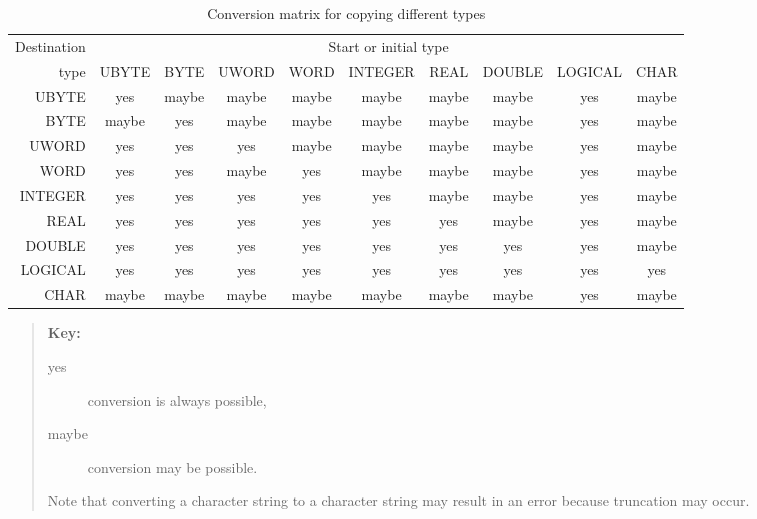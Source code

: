 \begin{table}[htbp]

\begin{center}
{\footnotesize
\begin{tabular}{r|ccccccccc}
Destination &\multicolumn{9}{c}{Start or initial type} \\
type    & UBYTE & BYTE  & UWORD & WORD  & INTEGER & REAL  & DOUBLE & LOGICAL & CHAR   \\ \hline
UBYTE   &  yes  & maybe & maybe & maybe & maybe   & maybe & maybe  &   yes   & maybe  \\
BYTE    & maybe &  yes  & maybe & maybe & maybe   & maybe & maybe  &   yes   & maybe  \\
UWORD   &  yes  &  yes  &  yes  & maybe & maybe   & maybe & maybe  &   yes   & maybe  \\
WORD    &  yes  &  yes  & maybe &  yes  & maybe   & maybe & maybe  &   yes   & maybe  \\
INTEGER &  yes  &  yes  &  yes  &  yes  &  yes    & maybe & maybe  &   yes   & maybe  \\
REAL    &  yes  &  yes  &  yes  &  yes  &  yes    &  yes  & maybe  &   yes   & maybe  \\
DOUBLE  &  yes  &  yes  &  yes  &  yes  &  yes    &  yes  &  yes   &   yes   & maybe  \\
LOGICAL &  yes  &  yes  &  yes  &  yes  &  yes    &  yes  &  yes   &   yes   &  yes   \\
CHAR    & maybe & maybe & maybe & maybe & maybe   & maybe & maybe  &   yes   & maybe  \\
\end{tabular}  }
\end{center}

\begin{quote}
{\bf Key:}

\begin{description}

  \item[yes] conversion is always possible,

  \item[maybe] conversion may be possible.


\end{description}

Note that converting a character string to a character string may result
in an error because truncation may occur.
\end{quote}

\caption{\label{CONVMAT}Conversion matrix for copying different types}

\end{table}


